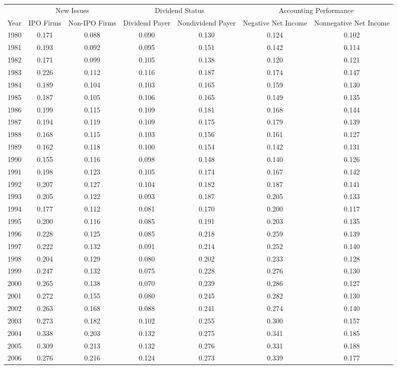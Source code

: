 \begin{tabular}{l c c c c c c}
\toprule
& \multicolumn{2}{c}{New Issues} & \multicolumn{2}{c}{Dividend Status} & \multicolumn{2}{c}{Accounting Performance} \\
\cmidrule(lr){2-3} \cmidrule(lr){4-5} \cmidrule(lr){6-7}
Year & \multicolumn{1}{p{2cm}}{\centering IPO Firms} & \multicolumn{1}{p{2cm}}{\centering Non-IPO Firms} & \multicolumn{1}{p{2cm}}{\centering Dividend Payer} & \multicolumn{1}{p{2cm}}{\centering Nondividend Payer} & \multicolumn{1}{p{2cm}}{\centering Negative Net Income} & \multicolumn{1}{p{2cm}}{\centering Nonnegative Net Income}\\
\midrule
1980&0.171&0.088&0.090&0.130&0.124&0.102\\
1981&0.193&0.092&0.095&0.151&0.142&0.114\\
1982&0.171&0.099&0.105&0.138&0.120&0.121\\
1983&0.226&0.112&0.116&0.187&0.174&0.147\\
1984&0.189&0.104&0.103&0.165&0.159&0.130\\
1985&0.187&0.105&0.106&0.165&0.149&0.135\\
1986&0.199&0.115&0.109&0.181&0.168&0.144\\
1987&0.194&0.119&0.109&0.175&0.179&0.139\\
1988&0.168&0.115&0.103&0.156&0.161&0.127\\
1989&0.162&0.118&0.100&0.154&0.142&0.131\\
1990&0.155&0.116&0.098&0.148&0.140&0.126\\
1991&0.198&0.123&0.105&0.174&0.167&0.142\\
1992&0.207&0.127&0.104&0.182&0.187&0.141\\
1993&0.205&0.122&0.093&0.187&0.205&0.133\\
1994&0.177&0.112&0.081&0.170&0.200&0.117\\
1995&0.200&0.116&0.085&0.191&0.203&0.135\\
1996&0.228&0.125&0.085&0.218&0.259&0.139\\
1997&0.222&0.132&0.091&0.214&0.252&0.140\\
1998&0.204&0.129&0.080&0.202&0.233&0.128\\
1999&0.247&0.132&0.075&0.228&0.276&0.130\\
2000&0.265&0.138&0.070&0.239&0.286&0.127\\
2001&0.272&0.155&0.080&0.245&0.282&0.130\\
2002&0.263&0.168&0.088&0.241&0.274&0.140\\
2003&0.273&0.182&0.102&0.255&0.300&0.157\\
2004&0.338&0.203&0.132&0.275&0.341&0.185\\
2005&0.309&0.213&0.132&0.276&0.331&0.188\\
2006&0.276&0.216&0.124&0.273&0.339&0.177\\
\bottomrule
\end{tabular}
